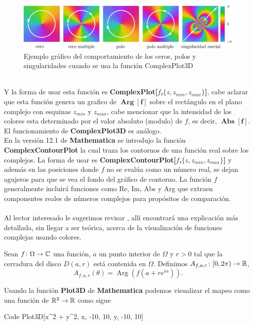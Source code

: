 \begin{figure}[h!]
	\centering
	\includegraphics[width=0.75\linewidth]{img/plotco}
	\caption{Ejemplo gráfico del comportamiento de los ceros, polos y singularidades cuando se usa la función ComplexPlot3D}
	\label{fig:plotco}
\end{figure}
\\Y la forma de usar esta función es \textbf{ComplexPlot[$f$,$\{z,z_{min},z_{max}\}$]}, cabe aclarar que esta función genera un grafico de $\mathbf{\operatorname{Arg}[f]}$ sobre el rectángulo en el plano complejo con esquinas $z_{min}$ y $z_{max}$, cabe mencionar que la intensidad de los colores esta determinado por el valor absoluto (modulo) de $f$, es decir,  $\mathbf{\operatorname{Abs}[f]}$. El funcionamiento de \textbf{ComplexPlot3D}  es análogo.\\
En la versión 12.1 de \textbf{Mathematica} se introdujo la función \textbf{ComplexContourPlot} la cual traza los contornos de una función real sobre los complejos. La forma de usar es \textbf{ComplexContourPlot[$f$,$\{z,z_{min},z_{max}\}$]} y además en las posiciones donde $f$ no se evalúa como un número real, se dejan agujeros para que se vea el fondo del gráfico de contorno. La función $f$ generalmente incluirá funciones como Re, Im, Abs y Arg que extraen componentes reales de números complejos para propósitos de comparación.\\\\
\noindent Al lector interesado le sugerimos revisar \cite{Domain_coloring}, allí encontrará una explicación más detallada, sin llegar a ser teórica, acerca de la visualización de funciones complejas usando colores.\\

\begin{defi}
	Sean $f\colon \Omega\to\mathbb{C}$ una función, $a$ un punto interior de $\Omega$ y $r>0$ tal que la cerradura del disco $D(a,r)$ está contenida en $\Omega$. Definimos $A_{f,a,r}\colon[0,2\pi)\to\mathbb{R}$,
	\[
	A_{f,a,r}(\theta) = \operatorname{Arg}(f(a+re^{i\alpha})).
	\]
\end{defi}

\noindent Usando la función \textbf{Plot3D} de \textbf{Mathematica} podemos visualizar el mapeo como una función de $\mathbb{R}^2 \rightarrow \mathbb{R}$ como sigue
\begin{mmaCell}[functionlocal=y]{Code}
	  Plot3D[x^2 + y^2, {x, -10, 10}, {y, -10, 10}]
\end{mmaCell}

